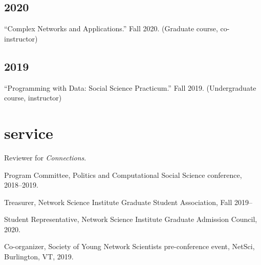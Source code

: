 \documentclass[11pt, letter]{article}
\begin{document}
\subsection{2020}
\begin{hangparas}{.25in}{1}
``Complex Networks and Applications.'' Fall 2020. (Graduate course,
co-instructor)
\end{hangparas}
\vspace{1mm}

\subsection{2019}
\begin{hangparas}{.25in}{1}
``Programming with Data: Social Science Practicum.'' Fall 2019.
(Undergraduate course, instructor) \vspace{2mm}
\end{hangparas}


 \section{service}
 Reviewer for \textit{Connections}.

 Program Committee, Politics and Computational Social Science conference,
 2018--2019.

 Treasurer, Network Science Institute Graduate Student Association, Fall 2019--

 Student Representative, Network Science Institute Graduate Admission Council,
 2020.

 Co-organizer, Society of Young Network Scientists pre-conference event, NetSci,
 Burlington, VT, 2019.
\end{document}
